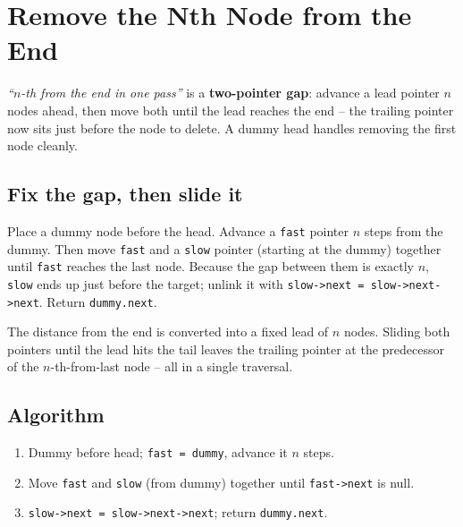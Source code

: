 \section{Remove the Nth Node from the End}
\label{sec:ll-remove-nth}


\begin{patternbox}
\emph{``$n$-th from the end in one pass''} is a \textbf{two-pointer gap}:
advance a lead pointer $n$ nodes ahead, then move both until the lead
reaches the end -- the trailing pointer now sits just before the node to
delete. A dummy head handles removing the first node cleanly.
\end{patternbox}

\subsection*{Fix the gap, then slide it}

Place a dummy node before the head. Advance a \texttt{fast} pointer $n$ steps
from the dummy. Then move \texttt{fast} and a \texttt{slow} pointer (starting
at the dummy) together until \texttt{fast} reaches the last node. Because the
gap between them is exactly $n$, \texttt{slow} ends up just before the target;
unlink it with \texttt{slow->next = slow->next->next}. Return
\texttt{dummy.next}.

\begin{ideabox}
The distance from the end is converted into a fixed lead of $n$ nodes.
Sliding both pointers until the lead hits the tail leaves the trailing
pointer at the predecessor of the $n$-th-from-last node -- all in a single
traversal.
\end{ideabox}

\subsection*{Algorithm}

\begin{enumerate}
  \item Dummy before head; \texttt{fast = dummy}, advance it $n$ steps.
  \item Move \texttt{fast} and \texttt{slow} (from dummy) together until
        \texttt{fast->next} is null.
  \item \texttt{slow->next = slow->next->next}; return \texttt{dummy.next}.
\end{enumerate}

